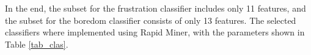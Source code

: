 \documentclass[a4paper,twoside]{article}
\begin{document}

In the end, the subset for the frustration classifier includes only 11 features, and 
the subset for the boredom classifier consists of only 13 features. 
%
%
The selected classifiers where implemented using Rapid Miner, with the
  parameters shown in Table \ref{tab_clas}. 

\end{document}
